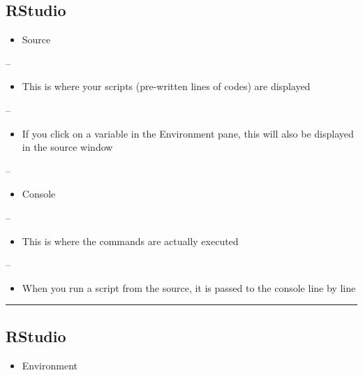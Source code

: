 \documentclass[]{article}
\providecommand{\tightlist}{%
  \setlength{\itemsep}{0pt}\setlength{\parskip}{0pt}}
\begin{document}
\hypertarget{rstudio-1}{%
\subsection{RStudio}\label{rstudio-1}}

\begin{itemize}
\tightlist
\item
  Source
\end{itemize}

--

\begin{itemize}
\tightlist
\item
  This is where your scripts (pre-written lines of codes) are displayed
\end{itemize}

--

\begin{itemize}
\tightlist
\item
  If you click on a variable in the Environment pane, this will also be
  displayed in the source window
\end{itemize}

--

\begin{itemize}
\tightlist
\item
  Console
\end{itemize}

--

\begin{itemize}
\tightlist
\item
  This is where the commands are actually executed
\end{itemize}

--

\begin{itemize}
\tightlist
\item
  When you run a script from the source, it is passed to the console
  line by line
\end{itemize}

\begin{center}\rule{0.5\linewidth}{\linethickness}\end{center}

\hypertarget{rstudio-2}{%
\subsection{RStudio}\label{rstudio-2}}

\begin{itemize}
\tightlist
\item
  Environment
\end{itemize}
\end{document}
